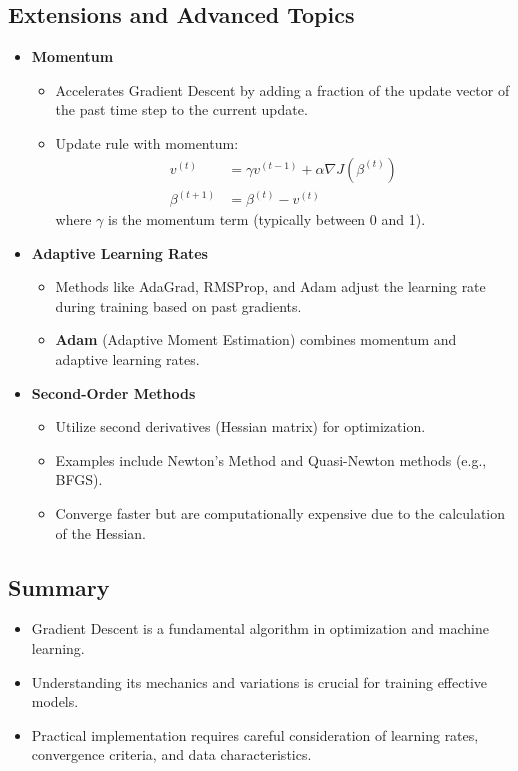 \documentclass{article}
\begin{document}
\subsection{Extensions and Advanced Topics}

\begin{itemize}
    \item \textbf{Momentum}
    \begin{itemize}
        \item Accelerates Gradient Descent by adding a fraction of the update vector of the past time step to the current update.
        \item Update rule with momentum:
        \[
        \begin{aligned}
        v^{(t)} &= \gamma v^{(t-1)} + \alpha \nabla J(\beta^{(t)}) \\
        \beta^{(t+1)} &= \beta^{(t)} - v^{(t)}
        \end{aligned}
        \]
        where $\gamma$ is the momentum term (typically between 0 and 1).
    \end{itemize}
    \item \textbf{Adaptive Learning Rates}
    \begin{itemize}
        \item Methods like AdaGrad, RMSProp, and Adam adjust the learning rate during training based on past gradients.
        \item \textbf{Adam} (Adaptive Moment Estimation) combines momentum and adaptive learning rates.
    \end{itemize}
    \item \textbf{Second-Order Methods}
    \begin{itemize}
        \item Utilize second derivatives (Hessian matrix) for optimization.
        \item Examples include Newton's Method and Quasi-Newton methods (e.g., BFGS).
        \item Converge faster but are computationally expensive due to the calculation of the Hessian.
    \end{itemize}
\end{itemize}

\subsection{Summary}

\begin{itemize}
    \item Gradient Descent is a fundamental algorithm in optimization and machine learning.
    \item Understanding its mechanics and variations is crucial for training effective models.
    \item Practical implementation requires careful consideration of learning rates, convergence criteria, and data characteristics.
\end{itemize}
\end{document}
